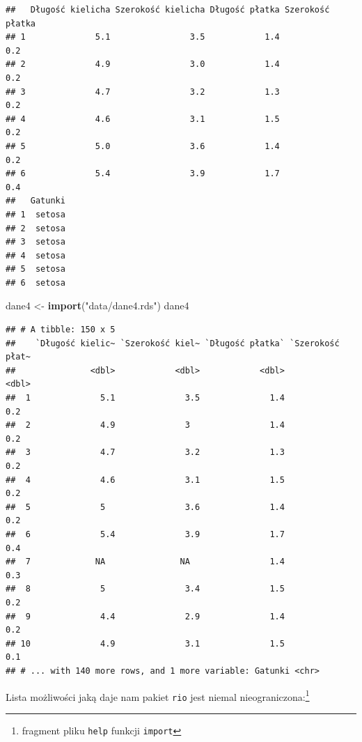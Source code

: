 \documentclass[]{book}
\newenvironment{Shaded}{\begin{snugshade}}{\end{snugshade}}
\newcommand{\KeywordTok}[1]{\textcolor[rgb]{0.13,0.29,0.53}{\textbf{#1}}}
\newcommand{\NormalTok}[1]{#1}
\newcommand{\StringTok}[1]{\textcolor[rgb]{0.31,0.60,0.02}{#1}}
\let\rmarkdownfootnote\footnote%
\def\footnote{\protect\rmarkdownfootnote}
\theoremstyle{plain}
\theoremstyle{definition}
\begin{document}
\begin{verbatim}
##   Długość kielicha Szerokość kielicha Długość płatka Szerokość płatka
## 1              5.1                3.5            1.4              0.2
## 2              4.9                3.0            1.4              0.2
## 3              4.7                3.2            1.3              0.2
## 4              4.6                3.1            1.5              0.2
## 5              5.0                3.6            1.4              0.2
## 6              5.4                3.9            1.7              0.4
##   Gatunki
## 1  setosa
## 2  setosa
## 3  setosa
## 4  setosa
## 5  setosa
## 6  setosa
\end{verbatim}

\begin{Shaded}
\begin{Highlighting}[]
\NormalTok{dane4 <-}\StringTok{ }\KeywordTok{import}\NormalTok{(}\StringTok{"data/dane4.rds"}\NormalTok{)}
\NormalTok{dane4}
\end{Highlighting}
\end{Shaded}

\begin{verbatim}
## # A tibble: 150 x 5
##    `Długość kielic~ `Szerokość kiel~ `Długość płatka` `Szerokość płat~
##               <dbl>            <dbl>            <dbl>            <dbl>
##  1              5.1              3.5              1.4              0.2
##  2              4.9              3                1.4              0.2
##  3              4.7              3.2              1.3              0.2
##  4              4.6              3.1              1.5              0.2
##  5              5                3.6              1.4              0.2
##  6              5.4              3.9              1.7              0.4
##  7             NA               NA                1.4              0.3
##  8              5                3.4              1.5              0.2
##  9              4.4              2.9              1.4              0.2
## 10              4.9              3.1              1.5              0.1
## # ... with 140 more rows, and 1 more variable: Gatunki <chr>
\end{verbatim}

Lista możliwości jaką daje nam pakiet \texttt{rio} \citep{R-rio} jest niemal nieograniczona:\footnote{fragment pliku \texttt{help} funkcji \texttt{import}}
\end{document}
